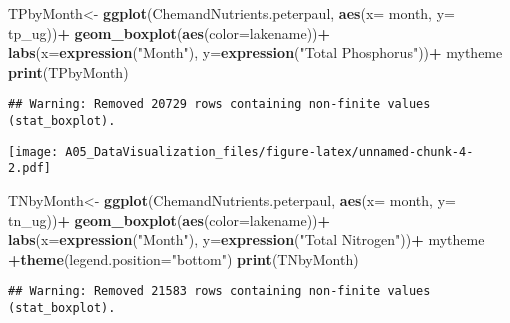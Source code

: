 \documentclass[]{article}
\newenvironment{Shaded}{\begin{snugshade}}{\end{snugshade}}
\newcommand{\DataTypeTok}[1]{\textcolor[rgb]{0.13,0.29,0.53}{#1}}
\newcommand{\KeywordTok}[1]{\textcolor[rgb]{0.13,0.29,0.53}{\textbf{#1}}}
\newcommand{\NormalTok}[1]{#1}
\newcommand{\OperatorTok}[1]{\textcolor[rgb]{0.81,0.36,0.00}{\textbf{#1}}}
\newcommand{\StringTok}[1]{\textcolor[rgb]{0.31,0.60,0.02}{#1}}
\begin{document}
\begin{Shaded}
\begin{Highlighting}[]
\NormalTok{TPbyMonth<-}
\StringTok{  }\KeywordTok{ggplot}\NormalTok{(ChemandNutrients.peterpaul, }
         \KeywordTok{aes}\NormalTok{(}\DataTypeTok{x=}\NormalTok{ month, }\DataTypeTok{y=}\NormalTok{ tp_ug))}\OperatorTok{+}
\StringTok{  }\KeywordTok{geom_boxplot}\NormalTok{(}\KeywordTok{aes}\NormalTok{(}\DataTypeTok{color=}\NormalTok{lakename))}\OperatorTok{+}
\StringTok{  }\KeywordTok{labs}\NormalTok{(}\DataTypeTok{x=}\KeywordTok{expression}\NormalTok{(}\StringTok{"Month"}\NormalTok{), }\DataTypeTok{y=}\KeywordTok{expression}\NormalTok{(}\StringTok{"Total Phosphorus"}\NormalTok{))}\OperatorTok{+}
\StringTok{  }\NormalTok{mytheme}
\KeywordTok{print}\NormalTok{(TPbyMonth)}
\end{Highlighting}
\end{Shaded}

\begin{verbatim}
## Warning: Removed 20729 rows containing non-finite values (stat_boxplot).
\end{verbatim}

\texttt{[image: A05\_DataVisualization\_files/figure-latex/unnamed-chunk-4-2.pdf]}

\begin{Shaded}
\begin{Highlighting}[]
\NormalTok{TNbyMonth<-}
\StringTok{  }\KeywordTok{ggplot}\NormalTok{(ChemandNutrients.peterpaul, }
         \KeywordTok{aes}\NormalTok{(}\DataTypeTok{x=}\NormalTok{ month, }\DataTypeTok{y=}\NormalTok{ tn_ug))}\OperatorTok{+}
\StringTok{  }\KeywordTok{geom_boxplot}\NormalTok{(}\KeywordTok{aes}\NormalTok{(}\DataTypeTok{color=}\NormalTok{lakename))}\OperatorTok{+}\StringTok{ }
\StringTok{  }\KeywordTok{labs}\NormalTok{(}\DataTypeTok{x=}\KeywordTok{expression}\NormalTok{(}\StringTok{"Month"}\NormalTok{), }\DataTypeTok{y=}\KeywordTok{expression}\NormalTok{(}\StringTok{"Total Nitrogen"}\NormalTok{))}\OperatorTok{+}\StringTok{ }\NormalTok{mytheme }\OperatorTok{+}\KeywordTok{theme}\NormalTok{(}\DataTypeTok{legend.position=}\StringTok{"bottom"}\NormalTok{)}
\KeywordTok{print}\NormalTok{(TNbyMonth)}
\end{Highlighting}
\end{Shaded}

\begin{verbatim}
## Warning: Removed 21583 rows containing non-finite values (stat_boxplot).
\end{verbatim}
\end{document}
